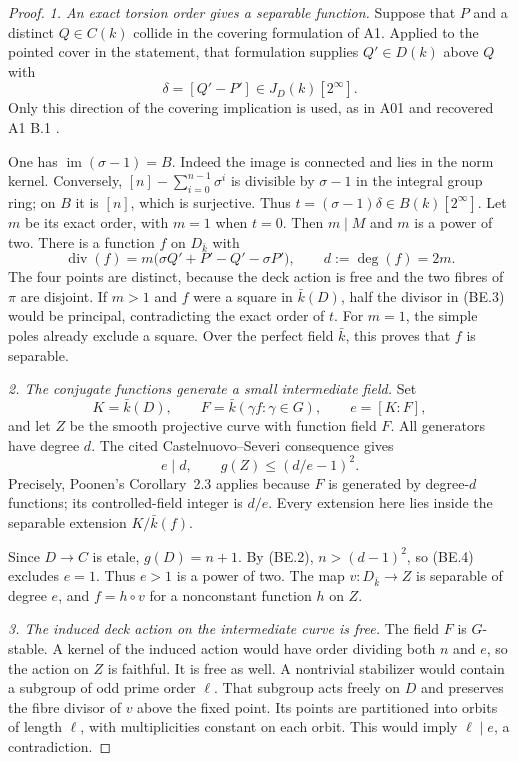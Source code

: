 \begin{proof}
\emph{1. An exact torsion order gives a separable function.}
Suppose that $P$ and a distinct $Q\in C(k)$ collide in the
covering formulation of A1. Applied to the pointed cover in the
statement, that formulation supplies $Q'\in D(k)$ above $Q$ with
\[
                    \delta=[Q'-P']\in J_D(k)[2^\infty].
\]
Only this direction of the covering implication is used, as in
A01 and recovered A1 B.1 \cite[B.1]{A1run}.

One has $\operatorname{im}(\sigma-1)=B$.
Indeed the image is connected and lies in the norm kernel.
Conversely, $[n]-\sum_{i=0}^{n-1}\sigma^i$ is divisible by
$\sigma-1$ in the integral group ring; on $B$ it is $[n]$,
which is surjective. Thus
$t=(\sigma-1)\delta\in B(k)[2^\infty]$.
Let $m$ be its exact order, with $m=1$ when $t=0$.
Then $m\mid M$ and $m$ is a power of two. There is a function
$f$ on $D_{\bar k}$ with
\[
 \operatorname{div}(f)
       =m\bigl(\sigma Q'+P'-Q'-\sigma P'\bigr),
                  \qquad d:=\deg(f)=2m.
 \tag{BE.3}
\]
The four points are distinct, because the deck action is free
and the two fibres of $\pi$ are disjoint. If $m>1$ and $f$ were
a square in $\bar k(D)$, half the divisor in (BE.3) would be
principal, contradicting the exact order of $t$. For $m=1$,
the simple poles already exclude a square. Over the perfect
field $\bar k$, this proves that $f$ is separable.

\emph{2. The conjugate functions generate a small intermediate field.}
Set
\[
 K=\bar k(D),\qquad F=\bar k(\gamma f:\gamma\in G),
       \qquad e=[K:F],
\]
and let $Z$ be the smooth projective curve with function field $F$.
All generators have degree $d$. The cited Castelnuovo--Severi
consequence gives
\[
                 e\mid d,\qquad g(Z)\le(d/e-1)^2.
 \tag{BE.4}
\]
Precisely, Poonen's Corollary~2.3 applies because $F$ is
generated by degree-$d$ functions; its controlled-field
integer is $d/e$. Every extension here lies inside the
separable extension $K/\bar k(f)$.

Since $D\to C$ is etale, $g(D)=n+1$.
By (BE.2), $n>(d-1)^2$, so (BE.4) excludes $e=1$.
Thus $e>1$ is a power of two. The map $v:D_{\bar k}\to Z$
is separable of degree $e$, and $f=h\circ v$ for a nonconstant
function $h$ on $Z$.

\emph{3. The induced deck action on the intermediate curve is free.}
The field $F$ is $G$-stable. A kernel of the induced action
would have order dividing both $n$ and $e$, so the action on
$Z$ is faithful. It is free as well. A nontrivial stabilizer
would contain a subgroup of odd prime order $\ell$. That
subgroup acts freely on $D$ and preserves the fibre divisor
of $v$ above the fixed point. Its points are partitioned into
orbits of length $\ell$, with multiplicities constant on each
orbit. This would imply $\ell\mid e$, a contradiction.


\end{proof}
